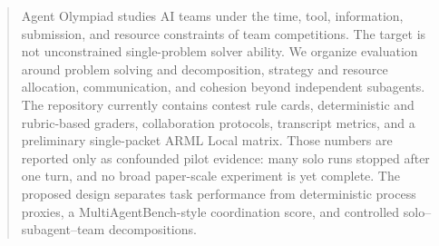 \begin{abstract}
Agent Olympiad studies AI teams under the time, tool, information, submission,
and resource constraints of team competitions. The target is not unconstrained
single-problem solver ability. We organize evaluation around problem solving
and decomposition, strategy and resource allocation, communication, and
cohesion beyond independent subagents. The repository currently contains
contest rule cards, deterministic and rubric-based graders, collaboration
protocols, transcript metrics, and a preliminary single-packet ARML Local
matrix. Those numbers are reported only as confounded pilot evidence: many
solo runs stopped after one turn, and no broad paper-scale experiment is yet
complete. The proposed design separates task performance from deterministic
process proxies, a MultiAgentBench-style coordination score, and controlled
solo--subagent--team decompositions.
\end{abstract}
